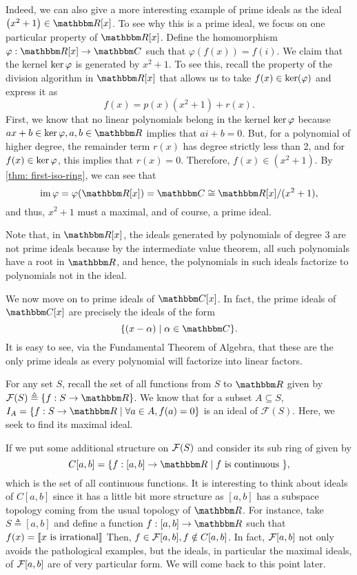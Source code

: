 \begin{example}
    Indeed, we can also give a more interesting example of prime ideals as the ideal $\left(x^{2}+1\right) \in \R[x]$. To see why this is a prime ideal, we focus on one particular property of ${\R}[x]$. 
    Define the homomorphism $\varphi: {\R}[x] \rightarrow {\C}$ such that $\varphi(f(x))=f(i)$. We claim that the kernel $\operatorname{\text{ker\/}}{\varphi}$ is generated by $x^{2}+1$. To see this, recall the property of the division algorithm in ${\R}[x]$ that allows us to take $f(x) \in {\operatorname{\text{ker\/}}}(\varphi)$ and express it as 
    \[f(x)=p(x)(x^{2}+1)+r(x).\]
    First, we know that no linear polynomials belong in the kernel $\operatorname{\text{ker\/}}{\varphi}$ because $ax+b \in \Ker{\varphi}, a,b \in \R$ implies that $ai+b=0$. But, for a polynomial of higher degree, the remainder term $r(x)$ has degree strictly less than 2, and for $f(x) \in \operatorname{\text{ker\/}}{\varphi}$, this implies that $r(x) = 0$. Therefore, $f(x) \in (x^2+1).$  By \cref{thm: first-iso-ring}, we can see that 
    \[
    \image{\varphi} = \varphi(\R[x]) = \C \cong \R[x]/(x^2+1),\]
    and thus, $x^2+1$ must a maximal, and of course, a prime ideal.

    Note that, in ${\R}[x]$, the ideals generated by polynomials of degree 3 are not prime ideals because by the intermediate value theorem, all such polynomials have a root in ${\R}$, and hence, the polynomials 
    in such ideals factorize to polynomials not in the ideal.
\end{example}

\begin{example}
    We now move on to prime ideals of ${\C}[x]$. In fact, the prime ideals of ${\C}[x]$ are precisely the ideals of the form
    \[\{(x-\alpha) \mid \alpha \in {\C}\}.\]
    It is easy to see, via the Fundamental Theorem of Algebra, that these are the only prime ideals as every polynomial will factorize into linear factors.
\end{example}

\begin{example}
    For any set $S$, recall the set of all functions from $S$ to ${\R}$ given by $\mathcal{F}(S)\triangleq\{f: S \rightarrow {\R}\}$. We know that for a subset $A \subseteq S$, $I_{A}=\{f: S \rightarrow {\R} \mid \forall a \in A, f(a)=0 \}$ is an ideal of $\mathcal{F}(S)$. Here, we seek to find its maximal ideal.  
    
    If we put some additional structure on $\mathcal{F}(S)$ and consider its sub ring of given by \[C[a, b]=\{f:[a, b] \rightarrow {\R} \mid f\text{ is continuous }\},\]
    which is the set of all continuous functions. It is interesting to think about ideals of $C[a, b]$ since it has a little bit more structure as $[a,b]$ has a subspace topology coming from the usual topology of ${\R}$. For instance, take $S\triangleq[a,b]$ and define a function $f: [a,b] \to \R$ such that $f(x) = \llbracket x\text{ is irrational}\rrbracket$ Then, $f \in \mathcal{F}{[a,b]}, f \notin C[a,b]$. In fact, $\mathcal{F}{[a,b]}$ not only avoids the pathological examples, but the ideals, in particular the maximal ideals, of $\mathcal{F}{[a,b]}$ are of very particular form. We will come back to this point later.
\end{example}

